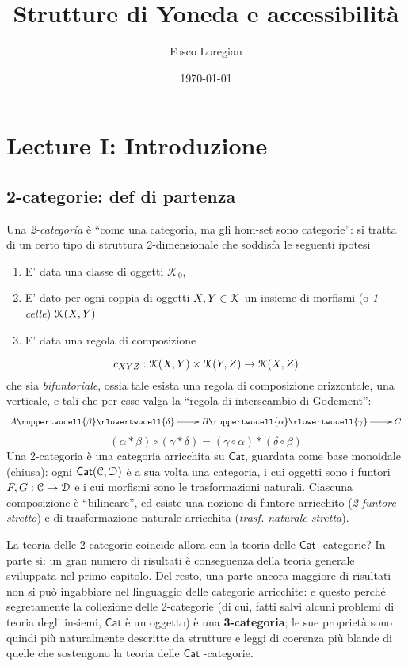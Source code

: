 \documentclass[11pt]{article}
\author{Fosco Loregian}
\date{\today}
\title{Strutture di Yoneda e accessibilità}
\def\C{\mathcal{C}}
\def\Cat{\mathsf{Cat}}
\theoremstyle{reference}
\begin{document}
\maketitle
\tableofcontents



\section{Lecture I: Introduzione}
\label{sec:org2468683}
\subsection{2-categorie: def di partenza}
\label{sec:orgdb57cf0}
Una \emph{2-categoria} è ``come una categoria, ma gli hom-set
sono categorie'': si tratta di un certo tipo di struttura
2-dimensionale che soddisfa le seguenti ipotesi

\begin{enumerate}
\item E' data una classe di oggetti \(\mathcal K_0\),
\item E' dato per ogni coppia di oggetti \(X,Y\in \cal K_0\) un
insieme di morfismi (o \emph{1-celle}) \({\cal K}(X,Y)\)
\item E' data una regola di composizione
\end{enumerate}
$$ c_{XYZ} : {\cal K}(X,Y)\times {\cal K}(Y,Z) \to {\cal
K}(X,Z) $$ che sia \emph{bifuntoriale}, ossia tale esista una
regola di composizione orizzontale, una verticale, e tali
che per esse valga la ``regola di interscambio di
Godement'': $$ \xymatrix{A \ruppertwocell{\beta}
\ar[r]\rlowertwocell{\delta}& B \ruppertwocell{\alpha}
\ar[r]\rlowertwocell{\gamma}& C} $$ $$ (\alpha *\beta)\circ
(\gamma * \delta) = (\gamma \circ\alpha) * (\delta \circ
\beta)$$ Una 2-categoria è una categoria arricchita su
\(\Cat\), guardata come base monoidale (chiusa): ogni
\(\Cat({\cal C},{\cal D})\) è a sua volta una categoria, i cui
oggetti sono i funtori \(F,G : \C\to {\cal D}\) e i cui
morfismi sono le trasformazioni naturali. Ciascuna
composizione è ``bilineare'', ed esiste una nozione di
funtore arricchito (\emph{2-funtore stretto}) e di trasformazione
naturale arricchita (\emph{trasf. naturale stretta}).

La teoria delle 2-categorie coincide allora con la teoria
delle \(\Cat\) -categorie? In parte sì: un gran numero di
risultati è conseguenza della teoria generale sviluppata nel
primo capitolo. Del resto, una parte ancora maggiore di
risultati non si può ingabbiare nel linguaggio delle
categorie arricchite: e questo perché segretamente la
collezione delle 2-categorie (di cui, fatti salvi alcuni
problemi di teoria degli insiemi, \(\Cat\) è un oggetto) è una
\textbf{3-categoria}; le sue proprietà sono quindi più naturalmente
descritte da strutture e leggi di coerenza più blande di
quelle che sostengono la teoria delle \(\Cat\) -categorie.
\end{document}
